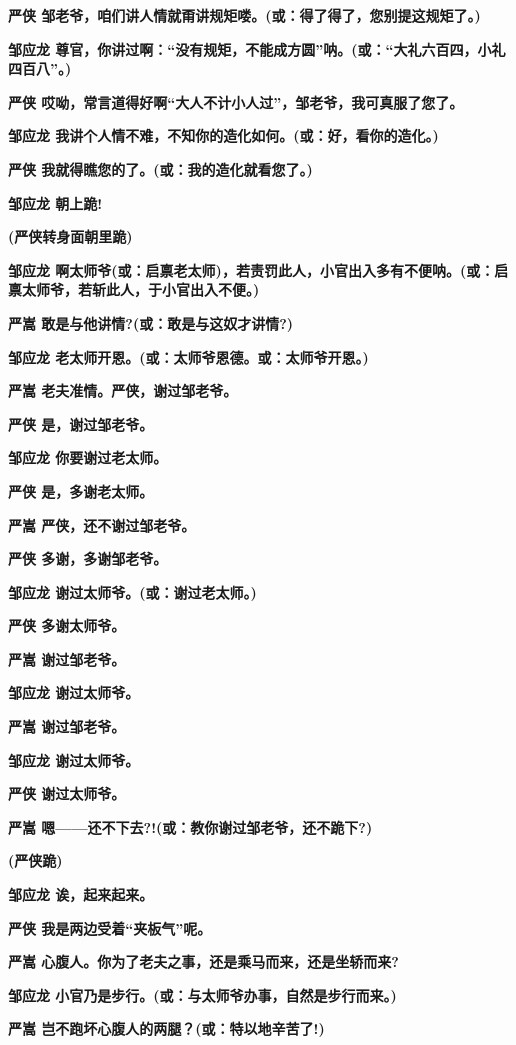 \textbf{严侠
邹老爷，咱们讲人情就甭讲规矩喽。(或：得了得了，您别提这规矩了。)}

\textbf{邹应龙
尊官，你讲过啊：``没有规矩，不能成方圆''呐。(或：``大礼六百四，小礼四百八''。)}

\textbf{严侠
哎呦，常言道得好啊``大人不计小人过''，邹老爷，我可真服了您了。}

\textbf{邹应龙 我讲个人情不难，不知你的造化如何。(或：好，看你的造化。)}

\textbf{严侠 我就得瞧您的了。(或：我的造化就看您了。)}

\textbf{邹应龙 朝上跪!}

\textbf{(严侠转身面朝里跪)}

\textbf{邹应龙
啊太师爷(或：启禀老太师)，若责罚此人，小官出入多有不便呐。(或：启禀太师爷，若斩此人，于小官出入不便。)}

\textbf{严嵩 敢是与他讲情?(或：敢是与这奴才讲情?)}

\textbf{邹应龙 老太师开恩。(或：太师爷恩德。或：太师爷开恩。)}

\textbf{严嵩 老夫准情。严侠，谢过邹老爷。}

\textbf{严侠 是，谢过邹老爷。}

\textbf{邹应龙 你要谢过老太师。}

\textbf{严侠 是，多谢老太师。}

\textbf{严嵩 严侠，还不谢过邹老爷。}

\textbf{严侠 多谢，多谢邹老爷。}

\textbf{邹应龙 谢过太师爷。(或：谢过老太师。)}

\textbf{严侠 多谢太师爷。}

\textbf{严嵩 谢过邹老爷。}

\textbf{邹应龙 谢过太师爷。}

\textbf{严嵩 谢过邹老爷。}

\textbf{邹应龙 谢过太师爷。}

\textbf{严侠 谢过太师爷。}

\textbf{严嵩 嗯------还不下去?!(或：教你谢过邹老爷，还不跪下?)}

\textbf{(严侠跪)}

\textbf{邹应龙 诶，起来起来。}

\textbf{严侠 我是两边受着``夹板气''呢。}

\textbf{严嵩 心腹人。你为了老夫之事，还是乘马而来，还是坐轿而来?}

\textbf{邹应龙 小官乃是步行。(或：与太师爷办事，自然是步行而来。)}

\textbf{严嵩 岂不跑坏心腹人的两腿？(或：特以地辛苦了!)}


